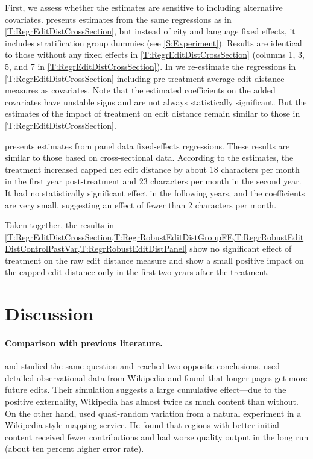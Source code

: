 \documentclass[12pt]{article}
\begin{document}
First, we assess whether the estimates are sensitive to including alternative covariates.
 presents estimates from the same regressions as in \cref{T:RegrEditDistCrossSection}, but instead of city and language fixed effects, it includes stratification group dummies (see \cref{S:Experiment}). Results are identical to those without any fixed effects in \cref{T:RegrEditDistCrossSection} (columns 1, 3, 5, and 7 in \cref{T:RegrEditDistCrossSection}). In  we re-estimate the regressions in \cref{T:RegrEditDistCrossSection} including pre-treatment average edit distance measures as covariates. Note that the estimated coefficients on the added covariates have unstable signs and are not always statistically significant. But the estimates of the impact of treatment on edit distance remain similar to those in \cref{T:RegrEditDistCrossSection}.
  
 presents estimates from panel data fixed-effects regressions. These results are similar to those based on cross-sectional data. According to the estimates, the treatment increased capped net edit distance by about 18 characters per month in the first year post-treatment and 23 characters per month in the second year. It had no statistically significant effect in the following years, and the coefficients are very small, suggesting an effect of fewer than 2 characters per month.

Taken together, the results in \cref{T:RegrEditDistCrossSection,T:RegrRobustEditDistGroupFE,T:RegrRobustEditDistControlPastVar,T:RegrRobustEditDistPanel}  show no significant effect of treatment on the raw edit distance measure and show a small positive impact on the capped edit distance only in the first two years after the treatment. 



\section{Discussion} \label{S:Discussion}

\paragraph{Comparison with previous literature.} \cite{aaltonen-seiler-2016} and \cite{nagaraj2017information} studied the same question and reached two opposite conclusions. \cite{aaltonen-seiler-2016} used detailed observational data from Wikipedia and found that longer pages get more future edits. Their simulation suggests a large cumulative effect---due to the positive externality, Wikipedia has almost twice as much content than without. On the other hand, \cite{nagaraj2017information} used quasi-random variation from a natural experiment in a Wikipedia-style mapping service. He found that regions with better initial content received fewer contributions and had worse quality output in the long run (about ten percent higher error rate).
\end{document}
